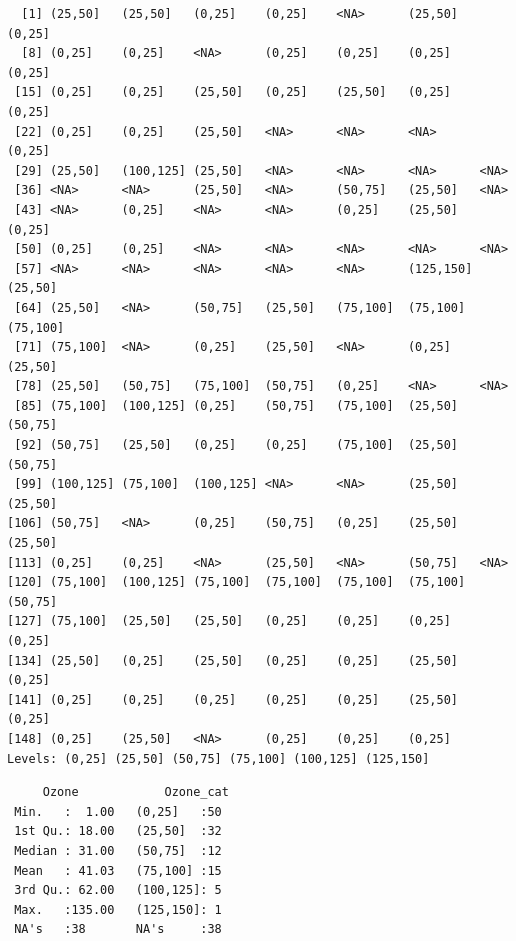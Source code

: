 \documentclass[
  letterpaper,
  DIV=11,
  numbers=noendperiod]{scrreprt}
\newenvironment{Shaded}{\begin{snugshade}}{\end{snugshade}}
\newcommand{\AttributeTok}[1]{\textcolor[rgb]{0.40,0.45,0.13}{#1}}
\newcommand{\DecValTok}[1]{\textcolor[rgb]{0.68,0.00,0.00}{#1}}
\newcommand{\FunctionTok}[1]{\textcolor[rgb]{0.28,0.35,0.67}{#1}}
\newcommand{\NormalTok}[1]{\textcolor[rgb]{0.00,0.23,0.31}{#1}}
\newcommand{\OtherTok}[1]{\textcolor[rgb]{0.00,0.23,0.31}{#1}}
\newcommand{\SpecialCharTok}[1]{\textcolor[rgb]{0.37,0.37,0.37}{#1}}
\begin{document}
\begin{verbatim}
  [1] (25,50]   (25,50]   (0,25]    (0,25]    <NA>      (25,50]   (0,25]   
  [8] (0,25]    (0,25]    <NA>      (0,25]    (0,25]    (0,25]    (0,25]   
 [15] (0,25]    (0,25]    (25,50]   (0,25]    (25,50]   (0,25]    (0,25]   
 [22] (0,25]    (0,25]    (25,50]   <NA>      <NA>      <NA>      (0,25]   
 [29] (25,50]   (100,125] (25,50]   <NA>      <NA>      <NA>      <NA>     
 [36] <NA>      <NA>      (25,50]   <NA>      (50,75]   (25,50]   <NA>     
 [43] <NA>      (0,25]    <NA>      <NA>      (0,25]    (25,50]   (0,25]   
 [50] (0,25]    (0,25]    <NA>      <NA>      <NA>      <NA>      <NA>     
 [57] <NA>      <NA>      <NA>      <NA>      <NA>      (125,150] (25,50]  
 [64] (25,50]   <NA>      (50,75]   (25,50]   (75,100]  (75,100]  (75,100] 
 [71] (75,100]  <NA>      (0,25]    (25,50]   <NA>      (0,25]    (25,50]  
 [78] (25,50]   (50,75]   (75,100]  (50,75]   (0,25]    <NA>      <NA>     
 [85] (75,100]  (100,125] (0,25]    (50,75]   (75,100]  (25,50]   (50,75]  
 [92] (50,75]   (25,50]   (0,25]    (0,25]    (75,100]  (25,50]   (50,75]  
 [99] (100,125] (75,100]  (100,125] <NA>      <NA>      (25,50]   (25,50]  
[106] (50,75]   <NA>      (0,25]    (50,75]   (0,25]    (25,50]   (25,50]  
[113] (0,25]    (0,25]    <NA>      (25,50]   <NA>      (50,75]   <NA>     
[120] (75,100]  (100,125] (75,100]  (75,100]  (75,100]  (75,100]  (50,75]  
[127] (75,100]  (25,50]   (25,50]   (0,25]    (0,25]    (0,25]    (0,25]   
[134] (25,50]   (0,25]    (25,50]   (0,25]    (0,25]    (25,50]   (0,25]   
[141] (0,25]    (0,25]    (0,25]    (0,25]    (0,25]    (25,50]   (0,25]   
[148] (0,25]    (25,50]   <NA>      (0,25]    (0,25]    (0,25]   
Levels: (0,25] (25,50] (50,75] (75,100] (100,125] (125,150]
\end{verbatim}

\begin{Shaded}
\end{Shaded}

\begin{verbatim}
     Ozone            Ozone_cat 
 Min.   :  1.00   (0,25]   :50  
 1st Qu.: 18.00   (25,50]  :32  
 Median : 31.00   (50,75]  :12  
 Mean   : 41.03   (75,100] :15  
 3rd Qu.: 62.00   (100,125]: 5  
 Max.   :135.00   (125,150]: 1  
 NA's   :38       NA's     :38  
\end{verbatim}
\end{document}

